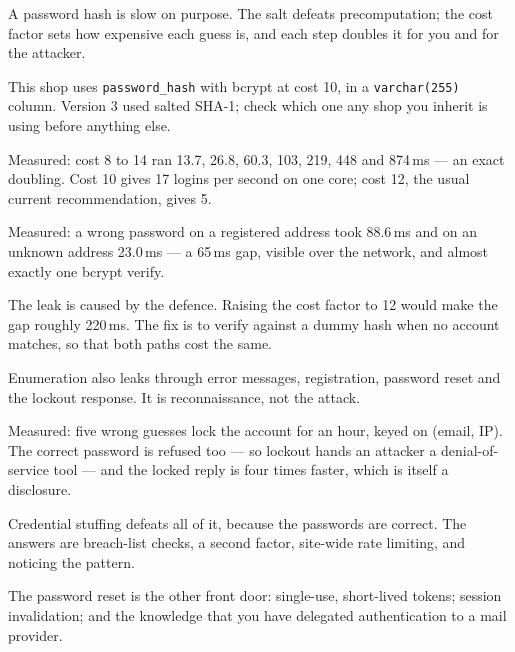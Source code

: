 \begin{chaptersummary}
\begin{tight}
  \item A password hash is slow on purpose. The salt defeats precomputation;
        the cost factor sets how expensive each guess is, and each step doubles
        it for you and for the attacker.
  \item This shop uses \texttt{password\_hash} with bcrypt at cost 10, in a
        \texttt{varchar(255)} column. Version 3 used salted SHA-1; check which
        one any shop you inherit is using before anything else.
  \item Measured: cost 8 to 14 ran 13.7, 26.8, 60.3, 103, 219, 448 and
        874\,ms --- an exact doubling. Cost 10 gives 17 logins per second on
        one core; cost 12, the usual current recommendation, gives 5.
  \item Measured: a wrong password on a registered address took 88.6\,ms and on
        an unknown address 23.0\,ms --- a 65\,ms gap, visible over the network,
        and almost exactly one bcrypt verify.
  \item The leak is caused by the defence. Raising the cost factor to 12 would
        make the gap roughly 220\,ms. The fix is to verify against a dummy hash
        when no account matches, so that both paths cost the same.
  \item Enumeration also leaks through error messages, registration, password
        reset and the lockout response. It is reconnaissance, not the attack.
  \item Measured: five wrong guesses lock the account for an hour, keyed on
        (email, IP). The correct password is refused too --- so lockout hands
        an attacker a denial-of-service tool --- and the locked reply is four
        times faster, which is itself a disclosure.
  \item Credential stuffing defeats all of it, because the passwords are
        correct. The answers are breach-list checks, a second factor, site-wide
        rate limiting, and noticing the pattern.
  \item The password reset is the other front door: single-use, short-lived
        tokens; session invalidation; and the knowledge that you have delegated
        authentication to a mail provider.
\end{tight}
\end{chaptersummary}

